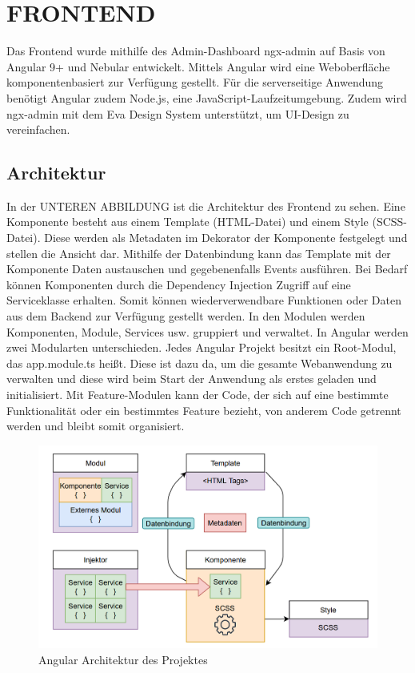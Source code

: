 \section{FRONTEND}\label{ch:frontend}

Das Frontend wurde mithilfe des Admin-Dashboard ngx-admin auf Basis von Angular 9+ und Nebular entwickelt. Mittels Angular wird eine Weboberfläche komponentenbasiert zur Verfügung gestellt. Für die serverseitige Anwendung benötigt Angular zudem Node.js, eine JavaScript-Laufzeitumgebung. Zudem wird ngx-admin mit dem Eva Design System unterstützt, um UI-Design zu vereinfachen. 

\subsection{Architektur}

In der UNTEREN ABBILDUNG ist die Architektur des Frontend zu sehen. Eine Komponente besteht aus einem Template (HTML-Datei) und einem Style (SCSS-Datei). Diese werden als Metadaten im Dekorator der Komponente festgelegt und stellen die Ansicht dar. Mithilfe der Datenbindung kann das Template mit der Komponente Daten austauschen und gegebenenfalls Events ausführen. Bei Bedarf können Komponenten durch die Dependency Injection Zugriff auf eine Serviceklasse erhalten. Somit können wiederverwendbare Funktionen oder Daten aus dem Backend zur Verfügung gestellt werden. In den Modulen werden Komponenten, Module, Services usw. gruppiert und verwaltet. In Angular werden zwei Modularten unterschieden. Jedes Angular Projekt besitzt ein Root-Modul, das app.module.ts heißt. Diese ist dazu da, um die gesamte Webanwendung zu verwalten und diese wird beim Start der Anwendung als erstes geladen und initialisiert. Mit Feature-Modulen kann der Code, der sich auf eine bestimmte Funktionalität oder ein bestimmtes Feature bezieht, von anderem Code getrennt werden und bleibt somit organisiert.

\begin{figure}[thpb]
      \centering
      \includegraphics[scale=0.55]{img/frontend_architecture.png}
      \caption{Angular Architektur des Projektes}
      \label{fig:frontend}
 \end{figure}


